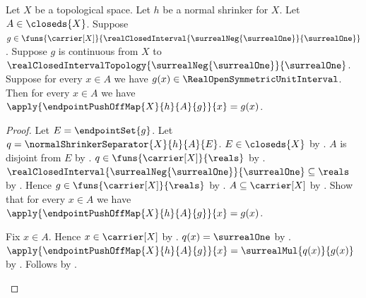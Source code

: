 \begin{theorem}\label{endpoint_push_off_map_agrees_on_A}
    Let $X$ be a topological space.
    Let $h$ be a normal shrinker for $X$.
    Let $A\in\closeds{X}$.
    Suppose
        $g\in\funs{\carrier[X]}
            {\realClosedInterval
                {\surrealNeg{\surrealOne}}{\surrealOne}}$.
    Suppose $g$ is continuous from $X$ to
        $\realClosedIntervalTopology
            {\surrealNeg{\surrealOne}}{\surrealOne}$.
    Suppose for every $x\in A$ we have
        $g(x)\in\RealOpenSymmetricUnitInterval$.
    Then for every $x\in A$ we have
        $\apply{\endpointPushOffMap{X}{h}{A}{g}}{x}=g(x)$.
\end{theorem}
\begin{proof}
    Let $E=\endpointSet{g}$.
    Let $q=\normalShrinkerSeparator{X}{h}{A}{E}$.
    $E\in\closeds{X}$ by .
    $A$ is disjoint from $E$
        by .
    $q\in\funs{\carrier[X]}{\reals}$
        by .
    $\realClosedInterval
        {\surrealNeg{\surrealOne}}{\surrealOne}\subseteq\reals$
        by .
    Hence $g\in\funs{\carrier[X]}{\reals}$
        by .
    $A\subseteq\carrier[X]$ by .
    Show that for every $x\in A$ we have
        $\apply{\endpointPushOffMap{X}{h}{A}{g}}{x}=g(x)$.
    \begin{subproof}
        Fix $x\in A$.
        Hence $x\in\carrier[X]$ by .
        $q(x)=\surrealOne$
            by .
        $\apply{\endpointPushOffMap{X}{h}{A}{g}}{x}
            =\surrealMul{q(x)}{g(x)}$
            by .
        Follows by
            .
    \end{subproof}
\end{proof}

